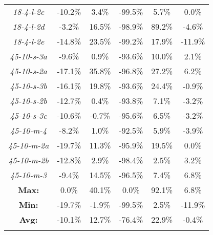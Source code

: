 \begin{table}[htbp!]
\begin{tabular}{cccccc}
\emph{18-4-l-2c}    &   -10.2\%  &   3.4\%    &   -99.5\%  &   5.7\%    &   0.0\%    \\
\emph{18-4-l-2d}    &   -3.2\%   &   16.5\%   &   -98.9\%  &   89.2\%   &   -4.6\%   \\
\emph{18-4-l-2e}    &   -14.8\%  &   23.5\%   &   -99.2\%  &   17.9\%   &   -11.9\%  \\
\emph{45-10-s-3a}   &   -9.6\%   &   0.9\%    &   -93.6\%  &   10.0\%   &   2.1\%    \\
\emph{45-10-s-2a}   &   -17.1\%  &   35.8\%   &   -96.8\%  &   27.2\%   &   6.2\%    \\
\emph{45-10-s-3b}   &   -16.1\%  &   19.8\%   &   -93.6\%  &   24.4\%   &   -0.9\%   \\
\emph{45-10-s-2b}   &   -12.7\%  &   0.4\%    &   -93.8\%  &   7.1\%    &   -3.2\%   \\
\emph{45-10-s-3c}   &   -10.6\%  &   -0.7\%   &   -95.6\%  &   6.5\%    &   -3.2\%   \\
\emph{45-10-m-4}    &   -8.2\%   &   1.0\%    &   -92.5\%  &   5.9\%    &   -3.9\%   \\
\emph{45-10-m-2a}   &   -19.7\%  &   11.3\%   &   -95.9\%  &   19.5\%   &   0.0\%    \\
\emph{45-10-m-2b}   &   -12.8\%  &   2.9\%    &   -98.4\%  &   2.5\%    &   3.2\%    \\
\emph{45-10-m-3}    &   -9.4\%   &   14.5\%   &   -96.5\%  &   7.4\%    &   6.8\%    \\ \hline
\textbf{Max:}   &   0.0\%    &   40.1\%   &   0.0\%    &   92.1\%   &   6.8\%    \\
\textbf{Min:}   &   -19.7\%  &   -1.9\%   &   -99.5\%  &   2.5\%    &   -11.9\%  \\
\textbf{Avg:}   &   -10.1\%  &   12.7\%   &   -76.4\%  &   22.9\%   &   -0.4\%   \\
    \hline
    \label{table:comparisonofqualities}
    \end{tabular}
\end{table}